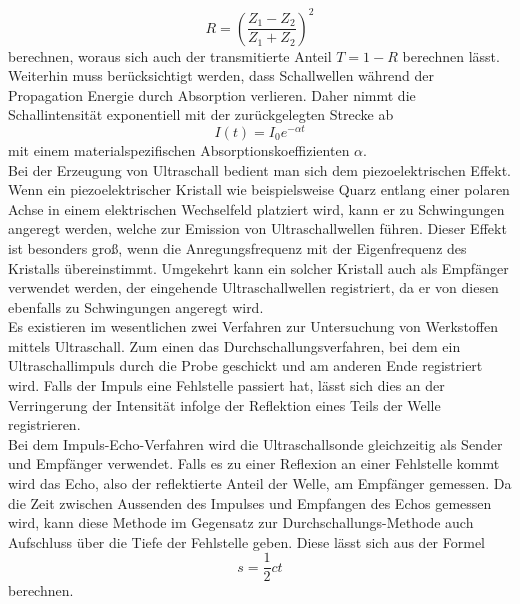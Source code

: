 \begin{equation}
R=(\frac{Z_1-Z_2}{Z_1+Z_2})^2
\end{equation}
berechnen, woraus sich auch der transmitierte Anteil $T=1-R$ berechnen lässt.
Weiterhin muss berücksichtigt werden, dass Schallwellen während der Propagation Energie durch Absorption verlieren. Daher nimmt die Schallintensität exponentiell mit der zurückgelegten Strecke ab
\begin{equation}
I(t)=I_0e^{-\alpha t}
\end{equation}
mit einem materialspezifischen Absorptionskoeffizienten $\alpha$. \\
Bei der Erzeugung von Ultraschall bedient man sich dem piezoelektrischen Effekt. Wenn ein piezoelektrischer Kristall wie beispielsweise Quarz entlang einer polaren Achse in einem elektrischen Wechselfeld platziert wird, kann er zu Schwingungen angeregt werden, welche zur Emission von Ultraschallwellen führen. Dieser Effekt ist besonders groß, wenn die Anregungsfrequenz mit der Eigenfrequenz des Kristalls übereinstimmt. Umgekehrt kann ein solcher Kristall auch als Empfänger verwendet werden, der eingehende Ultraschallwellen registriert, da er von diesen ebenfalls zu Schwingungen angeregt wird. \\
Es existieren im wesentlichen zwei Verfahren zur Untersuchung von Werkstoffen mittels Ultraschall. Zum einen das Durchschallungsverfahren, bei dem ein Ultraschallimpuls durch die Probe geschickt und am anderen Ende registriert wird. Falls der Impuls eine Fehlstelle passiert hat, lässt sich dies an der Verringerung der Intensität infolge der Reflektion eines Teils der Welle registrieren. \\
Bei dem Impuls-Echo-Verfahren wird die Ultraschallsonde gleichzeitig als Sender und Empfänger verwendet. Falls es zu einer Reflexion an einer Fehlstelle kommt wird das Echo, also der reflektierte Anteil der Welle, am Empfänger gemessen. Da die Zeit zwischen Aussenden des Impulses und Empfangen des Echos gemessen wird, kann diese Methode im Gegensatz zur Durchschallungs-Methode auch Aufschluss über die Tiefe der Fehlstelle geben. Diese lässt sich aus der Formel
\begin{equation}
    \label{eq:weg}
s=\frac{1}{2}ct
\end{equation}
berechnen.
